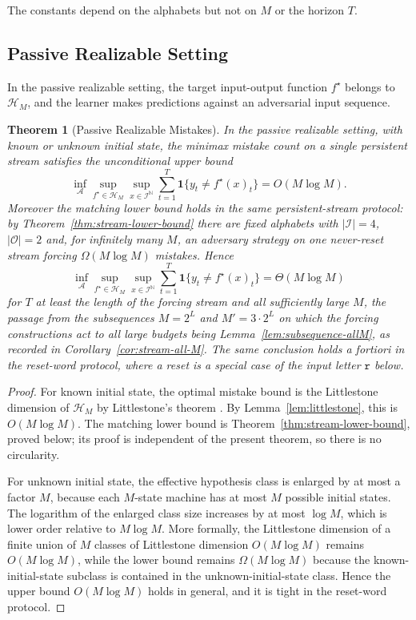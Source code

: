 \documentclass[12pt]{article}
\newtheorem{theorem}{Theorem}[section]
\theoremstyle{definition}
\begin{document}
The constants depend on the alphabets but not on $M$ or the horizon $T$.

\subsection{Passive Realizable Setting}
\label{subsec:passive-realizable}

In the passive realizable setting, the target input-output function
$f^\star$ belongs to $\mathcal H_M$, and the learner makes predictions against
an adversarial input sequence.

\begin{theorem}[Passive Realizable Mistakes]
\label{thm:passive-realizable}
In the passive realizable setting, with known or unknown initial state, the
minimax mistake count on a single persistent stream satisfies the
unconditional upper bound
\[
\inf_{\mathcal A}
\sup_{f^\star\in\mathcal H_M}
\sup_{x\in\mathcal I^{\mathbb N}}
\sum_{t=1}^T
\mathbf 1\{y_t\neq f^\star(x)_t\}
=
O(M\log M).
\]
Moreover the matching lower bound holds in the \emph{same} persistent-stream
protocol: by Theorem~\ref{thm:stream-lower-bound} there are fixed alphabets
with $|\mathcal I|=4$, $|\mathcal O|=2$ and, for infinitely many $M$, an
adversary strategy on one never-reset stream forcing
$\Omega(M\log M)$ mistakes.  Hence
\[
\inf_{\mathcal A}
\sup_{f^\star\in\mathcal H_M}
\sup_{x\in\mathcal I^{\mathbb N}}
\sum_{t=1}^T
\mathbf 1\{y_t\neq f^\star(x)_t\}
=
\Theta(M\log M)
\]
for $T$ at least the length of the forcing stream and all sufficiently large
$M$, the passage from the subsequences $M=2^L$ and $M'=3\cdot2^L$ on which
the forcing constructions act to all large budgets being
Lemma~\ref{lem:subsequence-allM}, as recorded in
Corollary~\ref{cor:stream-all-M}.  The same conclusion holds
a fortiori in the reset-word protocol, where a reset is a special case of the
input letter $\mathtt r$ below.
\end{theorem}

\begin{proof}
For known initial state, the optimal mistake bound is the Littlestone dimension
of $\mathcal H_M$ by Littlestone's theorem \cite{littlestone1988}.  By
Lemma~\ref{lem:littlestone}, this is $O(M\log M)$.  The matching lower bound
is Theorem~\ref{thm:stream-lower-bound}, proved below; its proof is
independent of the present theorem, so there is no circularity.

For unknown initial state, the effective hypothesis class is enlarged by at
most a factor $M$, because each $M$-state machine has at most $M$ possible
initial states.  The logarithm of the enlarged class size increases by at most
$\log M$, which is lower order relative to $M\log M$.  More formally, the
Littlestone dimension of a finite union of $M$ classes of Littlestone dimension
$O(M\log M)$ remains $O(M\log M)$, while the lower bound remains
$\Omega(M\log M)$ because the known-initial-state subclass is contained in the
unknown-initial-state class.  Hence the upper bound $O(M\log M)$ holds in
general, and it is tight in the reset-word protocol.
\end{proof}
\end{document}
